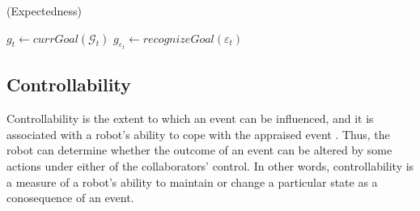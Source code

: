 \documentclass[letterpaper]{article}
\begin{document}
\begin{algorithm}
	\caption{(Expectedness)}
	\label{alg:expectedness}
	\begin{algorithmic}[1]
			\Statex
			\State $\mathit{g}_{t} \gets \textit{currGoal}{(\mathcal{G}_{t})}$
			\State $\mathit{g}_{\varepsilon_t} \gets \textit{recognizeGoal}{(\varepsilon_t)}$
			\Statex
				\State {}
			\EndIf
			\Statex
				\State {}
			\Else
					\State {}
				\Else
							\State {}
						\Else
							\State {}
						\EndIf
					\Else
							\State {}
						\Else
								\State {}
							\Else
								\State {}
							\EndIf
						\EndIf
					\EndIf
				\EndIf
			\EndIf
		\EndFunction
	\end{algorithmic}
\end{algorithm}

\subsection{Controllability}

Controllability is the extent to which an event can be influenced, and it is
associated with a robot's ability to cope with the appraised event
\cite{gratch:domain-independent}. Thus, the robot can determine whether the
outcome of an event can be altered by some actions under either of the
collaborators' control. In other words, controllability is a measure of a
robot's ability to maintain or change a particular state as a conosequence of an
event.
\end{document}
